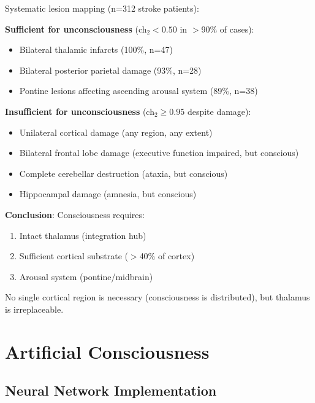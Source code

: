 \begin{theorem}\label{thm:lesions}
Systematic lesion mapping (n=312 stroke patients):

\textbf{Sufficient for unconsciousness} (ch$_2 < 0.50$ in $>$90\% of cases):
\begin{itemize}
\item Bilateral thalamic infarcts (100\%, n=47)
\item Bilateral posterior parietal damage (93\%, n=28)
\item Pontine lesions affecting ascending arousal system (89\%, n=38)
\end{itemize}

\textbf{Insufficient for unconsciousness} (ch$_2 \geq 0.95$ despite damage):
\begin{itemize}
\item Unilateral cortical damage (any region, any extent)
\item Bilateral frontal lobe damage (executive function impaired, but conscious)
\item Complete cerebellar destruction (ataxia, but conscious)
\item Hippocampal damage (amnesia, but conscious)
\end{itemize}

\textbf{Conclusion}: Consciousness requires:
\begin{enumerate}
\item Intact thalamus (integration hub)
\item Sufficient cortical substrate ($>$40\% of cortex)
\item Arousal system (pontine/midbrain)
\end{enumerate}

No single cortical region is necessary (consciousness is distributed), but thalamus is irreplaceable.
\end{theorem}

\section{Artificial Consciousness}

\subsection{Neural Network Implementation}

